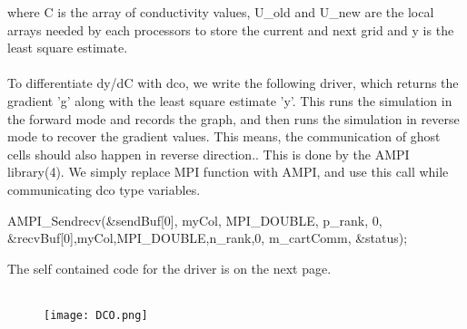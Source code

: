 \documentclass[10pt,a4paper]{report}
\begin{document}
where C is the array of conductivity values, U\_old and U\_new are the local arrays needed by each processors to store the current and next grid and y is the least square estimate. \\
\\
To differentiate dy/dC with dco, we write the following driver, which returns the gradient 'g' along with the least square estimate 'y'. This runs the simulation in the forward mode and records the graph, and then runs the simulation in reverse mode to recover the gradient values. This means, the communication of ghost cells should also happen in reverse direction.. This is done by the AMPI library(4). We simply replace MPI function with AMPI, and use this call while communicating dco type variables.
\begin{snugshade}
\begin{flushleft}
AMPI\_Sendrecv(\&sendBuf[0], myCol, MPI\_DOUBLE, p\_rank, 0, \&recvBuf[0],myCol,MPI\_DOUBLE,n\_rank,0, m\_cartComm, \&status);
\end{flushleft}
\end{snugshade}
The self contained code for the driver is on the next page.  \\
\\
\begin{figure}[h]
\begin{center}
\texttt{[image: DCO.png]} 
\label{fig:DCO}
\end{center}
\end{figure}
%
%
%
%
\end{document}
